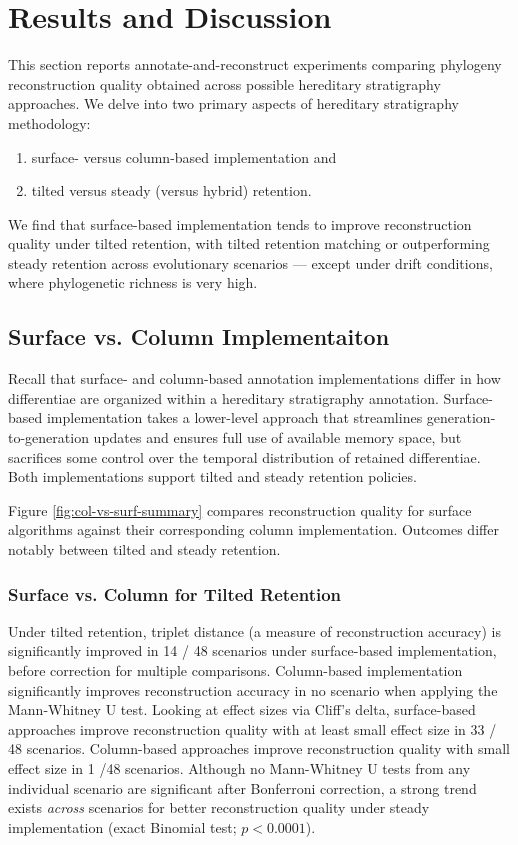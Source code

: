 \section{Results and Discussion} \label{sec:results}

This section reports annotate-and-reconstruct experiments comparing phylogeny reconstruction quality obtained across possible hereditary stratigraphy approaches.
We delve into two primary aspects of hereditary stratigraphy methodology:
\begin{enumerate}
\item surface- versus column-based implementation and
\item tilted versus steady (versus hybrid) retention.
\end{enumerate}

We find that surface-based implementation tends to improve reconstruction quality under tilted retention, with tilted retention matching or outperforming steady retention across evolutionary scenarios --- except under drift conditions, where phylogenetic richness is very high.

\subsection{Surface vs. Column Implementaiton} \label{sec:surface-vs-column}



Recall that surface- and column-based annotation implementations differ in how differentiae are organized within a hereditary stratigraphy annotation.
Surface-based implementation takes a lower-level approach that streamlines generation-to-generation updates and ensures full use of available memory space, but sacrifices some control over the temporal distribution of retained differentiae.
Both implementations support tilted and steady retention policies.

Figure \ref{fig:col-vs-surf-summary} compares reconstruction quality for surface algorithms against their corresponding column implementation.
Outcomes differ notably between tilted and steady retention.

\subsubsection{Surface vs. Column for Tilted Retention}

Under tilted retention, triplet distance (a measure of reconstruction accuracy) is significantly improved in 14 / 48 scenarios under surface-based implementation, before correction for multiple comparisons.
Column-based implementation significantly improves reconstruction accuracy in no scenario when applying the Mann-Whitney U test.
Looking at effect sizes via Cliff's delta, surface-based approaches improve reconstruction quality with at least small effect size in 33 / 48 scenarios.
Column-based approaches improve reconstruction quality with small effect size in 1 /48 scenarios.
Although no Mann-Whitney U tests from any individual scenario are significant after Bonferroni correction, a strong trend exists \textit{across} scenarios for better reconstruction quality under steady implementation (exact Binomial test; $p < 0.0001$).

